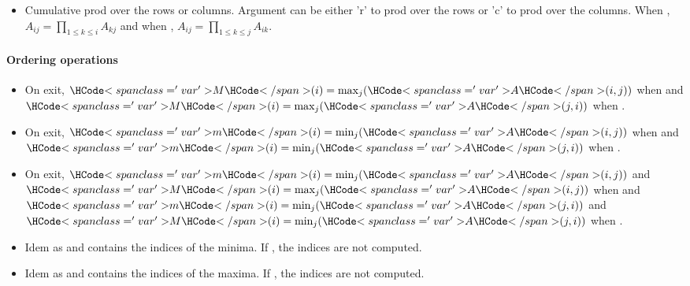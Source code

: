 \begin{itemize}
\item {} 
  \sshortdescribe Cumulative prod over the rows or columns. Argument 
  can be either 'r' to prod over the rows or 'c' to prod over the columns. When
  , $A_{ij} = \prod_{1 \le k \le i} A_{kj}$ and when , 
  $A_{ij} = \prod_{1 \le k \le j} A_{ik}$.
\end{itemize}

\paragraph{Ordering operations}

\begin{itemize}
\item {}
  \sshortdescribe On exit, $\var{M}(i) = \max_{j}(\var{A}(i, j))$ when 
  and $\var{M}(i) = \max_{j}(\var{A}(j, i))$ when .

\item {}
  \sshortdescribe On exit, $\var{m}(i) = \min_{j}(\var{A}(i, j))$ when 
  and $\var{m}(i) = \min_{j}(\var{A}(j, i))$ when .

\item {}
  \sshortdescribe On exit, $\var{m}(i) = \min_{j}(\var{A}(i, j))$ and $\var{M}(i) =
  \max_{j}(\var{A}(i, j))$ when  and $\var{m}(i) = \min_{j}(\var{A}(j, i))$
  and $\var{M}(i) = \min_{j}(\var{A}(j, i))$ when .
  
\item {}
  \sshortdescribe Idem as  and  contains the
  indices of the minima. If , the indices are not computed.

\item {}
  \sshortdescribe Idem as  and  contains the
  indices of the maxima. If , the indices are not computed.


\end{itemize}
